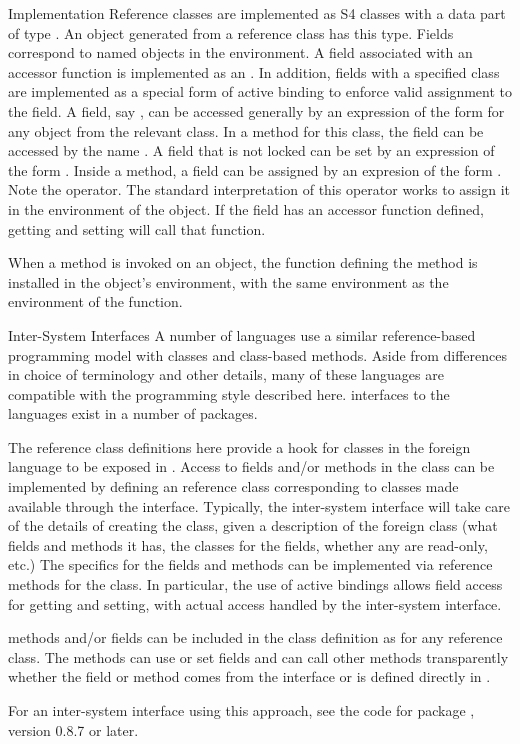 \begin{Section}{Implementation}
Reference classes are implemented as S4 classes with a data part of
type .
An object generated from a reference class has this type.
Fields correspond to named objects in the environment.
A field associated with an accessor function is implemented as an
.
In addition, fields with a specified class are implemented as a
special form of active binding to enforce valid assignment to the
field.
A field, say , can be accessed generally by an expression
of the form  
for any object from the relevant class.
In a method for this class, the field can be accessed by the name
.
A field that is not locked can be set by an expression of the form
.
Inside a method, a field can be assigned by an expresion of the form
.
Note the  operator.
The standard \R{} interpretation of this operator works to assign it in
the environment of the object.
If the field has an accessor function defined, getting and setting
will call that function.

When a method is invoked on an object, the function defining the method is
installed in the object's environment, with the same environment as the
environment of the function.

\end{Section}
%
\begin{Section}{Inter-System Interfaces}
A number of
languages use a similar reference-based programming model with classes
and class-based methods.
Aside from differences in choice of terminology and other details,
many of these languages are compatible with the programming style
described here.
\R{} interfaces to the languages exist in a number of packages.

The reference class definitions here provide a hook for
classes in the foreign language to be exposed in \R{}.
Access to fields and/or methods in the class can be
implemented by defining an \R{} reference class corresponding to
classes made available through the interface.
Typically, the inter-system interface will take care of the details of
creating the \R{} class, given a description of the foreign class (what fields
and methods it has, the classes for the fields, whether any are
read-only, etc.)
The specifics for the fields and methods can be implemented via
reference methods for the \R{} class.
In particular, the use of active bindings allows field access for
getting and setting, with
actual access handled by the inter-system interface.

\R{} methods and/or fields can be included in the class definition as for any
reference class.
The methods can use or set fields and can call other methods transparently
whether the field or method comes from the interface or is defined
directly in \R{}.

For an inter-system interface using this approach, see the code for package , version
0.8.7 or later.
\end{Section}
